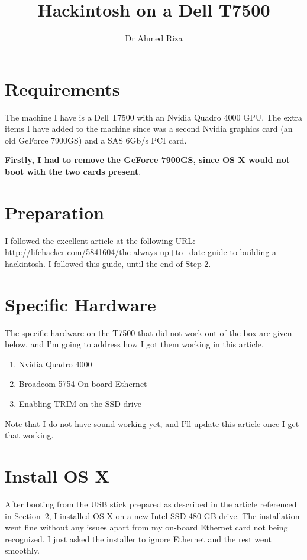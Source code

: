 \documentclass[11pt]{article}
\begin{document}
\title{Hackintosh on a Dell T7500}
\author{Dr Ahmed Riza}
\date{}
\maketitle

\section{Requirements}
The machine I have is a Dell T7500 with an Nvidia Quadro 4000 GPU.  The extra items I have added to the machine since was a second Nvidia graphics card (an old GeForce 7900GS) and a SAS 6Gb/s PCI card.

{\bf Firstly, I had to remove the GeForce 7900GS, since OS X would not boot with the two cards present}.

\section{Preparation}
\label{prep}
I followed the excellent article at the following URL:
\url{http://lifehacker.com/5841604/the-always-up+to+date-guide-to-building-a-hackintosh}.  I followed this guide, until the end of Step 2.

\section{Specific Hardware}
The specific hardware on the T7500 that did not work out of the box are given below, and I'm going to address how I got them working in this article.
\begin{enumerate}
\item Nvidia Quadro 4000
\item Broadcom 5754 On-board Ethernet 
\item Enabling TRIM on the SSD drive
\end{enumerate}
Note that I do not have sound working yet, and I'll update this article once I get that working.

\section{Install OS X}
After booting from the USB stick prepared as described in the article referenced in Section~\ref{prep}, I installed OS X on a new Intel SSD 480 GB drive.  The installation went fine without any issues apart from my on-board Ethernet card not being recognized.  I just asked the installer to ignore Ethernet and the rest went smoothly.
\end{document}
